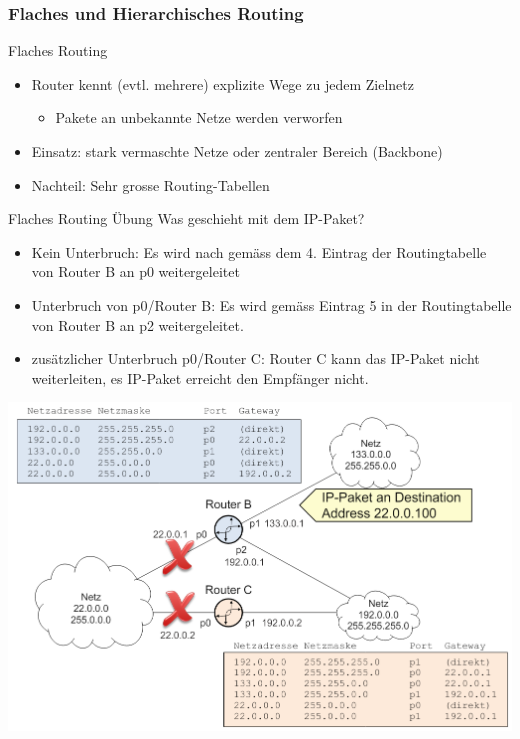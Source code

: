 \subsubsection{Flaches und Hierarchisches Routing}

\begin{concept}{Flaches Routing}
    \begin{itemize}
        \item Router kennt (evtl. mehrere) explizite Wege zu jedem Zielnetz
        \begin{itemize}
            \item Pakete an unbekannte Netze werden verworfen
        \end{itemize}
        \item Einsatz: stark vermaschte Netze oder zentraler Bereich (Backbone)
        \item Nachteil: Sehr grosse Routing-Tabellen
    \end{itemize}
\end{concept}

\begin{example2}{Flaches Routing Übung}
Was geschieht mit dem IP-Paket?
    \begin{itemize}
        \item Kein Unterbruch: Es wird nach gemäss dem 4. Eintrag der Routingtabelle von Router B an p0 weitergeleitet
        \item Unterbruch von p0/Router B: Es wird gemäss Eintrag 5 in der Routingtabelle von Router B an p2 weitergeleitet.
        \item zusätzlicher Unterbruch p0/Router C: Router C kann das IP-Paket nicht weiterleiten, es IP-Paket erreicht den Empfänger nicht.
    \end{itemize}
        \includegraphics[width=1\linewidth]{images/flaches_routing_bsp.png}
\end{example2}


